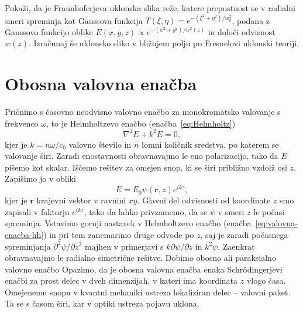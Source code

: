 \begin{definition}
Pokaži, da je Fraunhoferjeva uklonska slika reže, katere prepustnost se v radialni smeri
spreminja kot Gaussova funkcija $T(\xi, \eta)=e^{-(\xi^2+\eta^2)/w_0^2}$, podana z Gaussovo funkcijo
oblike $E(x,y,z) \propto e^{-(x^2+y^2)/w^2(z)}$ in določi odvisnost $w(z)$. Izračunaj še 
uklonsko sliko v bližnjem polju po Fresnelovi uklonski teoriji.
\end{definition}

\section{Obosna valovna enačba}
Pričnimo s časovno neodvisno valovno enačbo za monokromatsko valovanje
s frekvenco $\omega$, to je Helmholtzevo enačbo (enačba~\ref{eq:Helmholtz})
\begin{equation}
\nabla^{2}E+k^{2}E=0,
\label{eq:valovna-enacba-hh}
\end{equation}
kjer je $k=n\omega/c_{0}$ valovno število in $n$ lomni količnik
sredstva, po katerem se valovanje širi. Zaradi enostavnosti obravnavajmo
le eno polarizacijo, tako da $E$ pišemo kot skalar. Iščemo rešitev za
omejen snop, ki se širi približno vzdolž osi $z$. Zapišimo jo v obliki
\begin{equation}
E=E_{0}\psi(\mathbf{r},z)e^{ikz},
\label{eq:ravni-val-nastavek}
\end{equation}
kjer je $\mathbf{r}$ krajevni vektor v ravnini $xy$. Glavni del odvisnosti
od koordinate $z$ smo zapisali v faktorju $e^{ikz}$, tako da lahko
privzamemo, da se $\psi$ v smeri $z$ le počasi spreminja. Vstavimo
gornji nastavek v Helmholtzevo enačbo (enačba~\ref{eq:valovna-enacba-hh})
in pri tem zanemarimo druge odvode po $z$, saj je zaradi počasnega spreminjanja
$\partial^{2}\psi/\partial z^{2}$ majhen v primerjavi s $k\partial\psi/\partial z$ in $k^{2}\psi$.
Zaenkrat obravnavajmo le radialno simetrične rešitve. Dobimo obosno
ali paraksialno valovno enačbo
Opazimo, da je obosna valovna enačba enaka Schr\"{o}dingerjevi enačbi
za prost delec v dveh dimenzijah, v kateri ima koordinata $z$ vlogo
časa. Omejenemu snopu v kvantni mehaniki ustreza lokaliziran delec
-- valovni paket. Ta se s časom širi, kar v optiki ustreza pojavu uklona.

